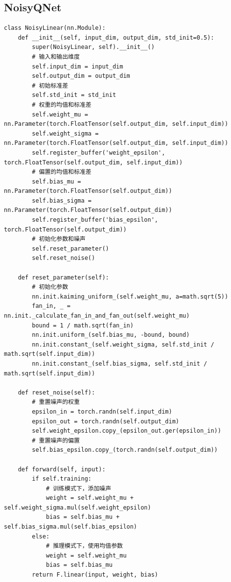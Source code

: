 \documentclass[a4paper]{ctexart}
\begin{document}
\subsection{NoisyQNet}
\begin{verbatim}
class NoisyLinear(nn.Module):
    def __init__(self, input_dim, output_dim, std_init=0.5):
        super(NoisyLinear, self).__init__()
        # 输入和输出维度
        self.input_dim = input_dim
        self.output_dim = output_dim
        # 初始标准差
        self.std_init = std_init
        # 权重的均值和标准差
        self.weight_mu = nn.Parameter(torch.FloatTensor(self.output_dim, self.input_dim))
        self.weight_sigma = nn.Parameter(torch.FloatTensor(self.output_dim, self.input_dim))
        self.register_buffer('weight_epsilon', torch.FloatTensor(self.output_dim, self.input_dim))
        # 偏置的均值和标准差
        self.bias_mu = nn.Parameter(torch.FloatTensor(self.output_dim))
        self.bias_sigma = nn.Parameter(torch.FloatTensor(self.output_dim))
        self.register_buffer('bias_epsilon', torch.FloatTensor(self.output_dim))
        # 初始化参数和噪声
        self.reset_parameter()
        self.reset_noise()

    def reset_parameter(self):
        # 初始化参数
        nn.init.kaiming_uniform_(self.weight_mu, a=math.sqrt(5))
        fan_in, _ = nn.init._calculate_fan_in_and_fan_out(self.weight_mu)
        bound = 1 / math.sqrt(fan_in)
        nn.init.uniform_(self.bias_mu, -bound, bound)
        nn.init.constant_(self.weight_sigma, self.std_init / math.sqrt(self.input_dim))
        nn.init.constant_(self.bias_sigma, self.std_init / math.sqrt(self.input_dim))

    def reset_noise(self):
        # 重置噪声的权重
        epsilon_in = torch.randn(self.input_dim)
        epsilon_out = torch.randn(self.output_dim)
        self.weight_epsilon.copy_(epsilon_out.ger(epsilon_in))
        # 重置噪声的偏置
        self.bias_epsilon.copy_(torch.randn(self.output_dim))

    def forward(self, input):
        if self.training:
            # 训练模式下，添加噪声
            weight = self.weight_mu + self.weight_sigma.mul(self.weight_epsilon)
            bias = self.bias_mu + self.bias_sigma.mul(self.bias_epsilon)
        else:
            # 推理模式下，使用均值参数
            weight = self.weight_mu
            bias = self.bias_mu
        return F.linear(input, weight, bias)
\end{verbatim}
\end{document}
